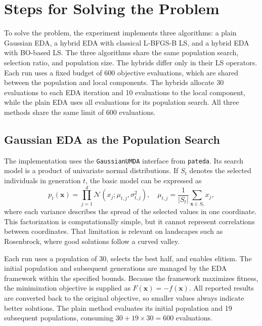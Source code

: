 \section{Steps for Solving the Problem}

To solve the problem, the experiment implements three algorithms: a plain Gaussian EDA, a hybrid EDA with classical L-BFGS-B LS, and a hybrid EDA with BO-based LS. The three algorithms share the same population search, selection ratio, and population size. The hybrids differ only in their LS operators. Each run uses a fixed budget of 600 objective evaluations, which are shared between the population and local components. The hybrids allocate 30 evaluations to each EDA iteration and 10 evaluations to the local component, while the plain EDA uses all evaluations for its population search. All three methods share the same limit of $600$ evaluations.

\subsection{Gaussian EDA as the Population Search}

The implementation uses the \texttt{GaussianUMDA} interface from \texttt{pateda}. Its search model is a product of univariate normal distributions. If $S_t$ denotes the selected individuals in generation $t$, the basic model can be expressed as
\begin{equation}
 p_t(\mathbf{x})=\prod_{j=1}^{d}\mathcal{N}(x_j;\mu_{t,j},\sigma_{t,j}^{2}),
 \quad \mu_{t,j}=\frac{1}{|S_t|}\sum_{\mathbf{x}\in S_t}x_j,
\end{equation}
where each variance describes the spread of the selected values in one coordinate. This factorization is computationally simple, but it cannot represent correlations between coordinates. That limitation is relevant on landscapes such as Rosenbrock, where good solutions follow a curved valley.

Each run uses a population of 30, selects the best half, and enables elitism. The initial population and subsequent generations are managed by the EDA framework within the specified bounds. Because the framework maximizes fitness, the minimization objective is supplied as $F(\mathbf{x})=-f(\mathbf{x})$. All reported results are converted back to the original objective, so smaller values always indicate better solutions. The plain method evaluates its initial population and 19 subsequent populations, consuming $30+19\times30=600$ evaluations.

